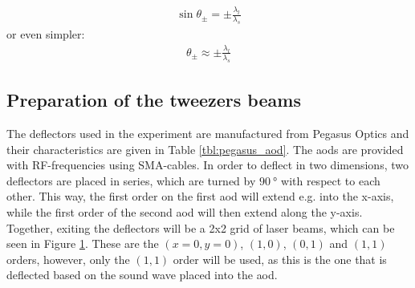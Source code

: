 \begin{align}
	\sin \theta_\pm = \pm \frac{\lambda_l}{\lambda_s}
\end{align}
or even simpler:
\begin{align}
	\theta_\pm \approx \pm \frac{\lambda_l}{\lambda_s}
\end{align}

\begin{figure}[t]
\end{figure}

\subsection{Preparation of the tweezers beams}

The deflectors used in the experiment are manufactured from Pegasus Optics and their characteristics are given in Table \ref{tbl:pegasus_aod}. The \acp{aod} are provided with RF-frequencies using SMA-cables. In order to deflect in two dimensions, two deflectors are placed in series, which are turned by $\SI{90}{\degree}$ with respect to each other. This way, the first order on the first \ac{aod} will extend e.g. into the x-axis, while the first order of the second \ac{aod} will then extend along the y-axis. Together, exiting the deflectors will be a 2x2 grid of laser beams, which can be seen in Figure \ref{fig:aod_pass}. These are the $(x=0, y=0)$, $(1, 0)$, $(0, 1)$ and $(1, 1)$ orders, however, only the $(1,1)$ order will be used, as this is the one that is deflected based on the sound wave placed into the \ac{aod}.

\begin{figure}[ht]
	\label{fig:aod_pass}
\end{figure}

